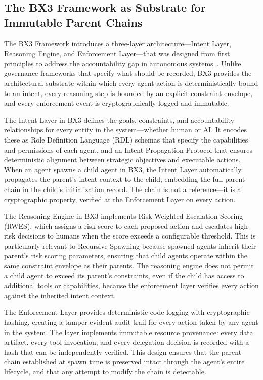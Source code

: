 \subsection{The BX3 Framework as Substrate for Immutable Parent Chains}

The BX3 Framework introduces a three-layer architecture—Intent Layer, Reasoning Engine, and Enforcement Layer—that was designed from first principles to address the accountability gap in autonomous systems~\cite{bx3_framework_2026}. Unlike governance frameworks that specify what should be recorded, BX3 provides the architectural substrate within which every agent action is deterministically bound to an intent, every reasoning step is bounded by an explicit constraint envelope, and every enforcement event is cryptographically logged and immutable.

The Intent Layer in BX3 defines the goals, constraints, and accountability relationships for every entity in the system—whether human or AI. It encodes these as Role Definition Language (RDL) schemas that specify the capabilities and permissions of each agent, and an Intent Propagation Protocol that ensures deterministic alignment between strategic objectives and executable actions. When an agent spawns a child agent in BX3, the Intent Layer automatically propagates the parent's intent context to the child, embedding the full parent chain in the child's initialization record. The chain is not a reference—it is a cryptographic property, verified at the Enforcement Layer on every action.

The Reasoning Engine in BX3 implements Risk-Weighted Escalation Scoring (RWES), which assigns a risk score to each proposed action and escalates high-risk decisions to humans when the score exceeds a configurable threshold. This is particularly relevant to Recursive Spawning because spawned agents inherit their parent's risk scoring parameters, ensuring that child agents operate within the same constraint envelope as their parents. The reasoning engine does not permit a child agent to exceed its parent's constraints, even if the child has access to additional tools or capabilities, because the enforcement layer verifies every action against the inherited intent context.

The Enforcement Layer provides deterministic code logging with cryptographic hashing, creating a tamper-evident audit trail for every action taken by any agent in the system. The layer implements immutable resource provenance: every data artifact, every tool invocation, and every delegation decision is recorded with a hash that can be independently verified. This design ensures that the parent chain established at spawn time is preserved intact through the agent's entire lifecycle, and that any attempt to modify the chain is detectable.

